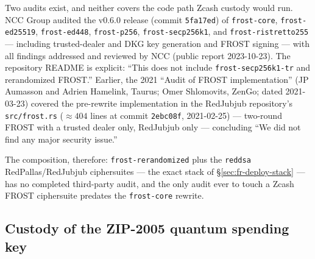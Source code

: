 \documentclass[11pt,a4paper]{article}
\theoremstyle{definition}
\begin{document}
Two audits exist, and neither covers the code path Zcash custody would
run. NCC Group audited the v0.6.0 release (commit \texttt{5fa17ed}) of
\texttt{frost-core}, \texttt{frost-ed25519}, \texttt{frost-ed448},
\texttt{frost-p256}, \texttt{frost-secp256k1}, and
\texttt{frost-ristretto255} --- including trusted-dealer and DKG key
generation and FROST signing --- with all findings addressed and reviewed
by NCC (public report 2023-10-23). The repository README is explicit:
``This does not include \texttt{frost-secp256k1-tr} and rerandomized
FROST.'' Earlier, the 2021 ``Audit of FROST implementation'' (JP Aumasson
and Adrien Hamelink, Taurus; Omer Shlomovits, ZenGo; dated 2021-03-23)
covered the pre-rewrite implementation in the RedJubjub repository's
\texttt{src/frost.rs} ($\approx 404$ lines at commit \texttt{2ebc08f},
2021-02-25) --- two-round FROST with a trusted dealer only, RedJubjub
only --- concluding ``We did not find any major security issue.''

The composition, therefore: \texttt{frost-rerandomized} plus the
\texttt{reddsa} RedPallas/RedJubjub ciphersuites --- the exact stack of
\S\ref{sec:fr-deploy-stack} --- has no completed third-party audit, and
the only audit ever to touch a Zcash FROST ciphersuite predates the
\texttt{frost-core} rewrite.

\subsection{Custody of the ZIP-2005 quantum spending key}
\label{sec:fr-deploy-qsk}
\end{document}
